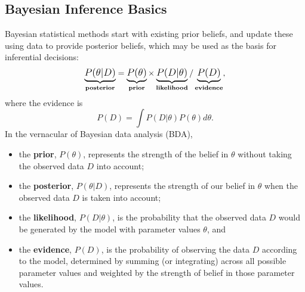 \subsection{Bayesian Inference Basics} 
Bayesian statistical methods start with existing {prior} beliefs, and update these using data to provide {posterior} beliefs, which may be used as the basis for inferential decisions:
$$ \large \underbrace{P( \theta | D )}_{\textbf{posterior}} = \underbrace{P(\theta)}_{\textbf{prior}} \times  \underbrace{P(D|\theta)}_{\textbf{likelihood}} /\underbrace{P(D)}_{\textbf{evidence}}, $$
where the evidence is 
$$ P(D) = \int P(D|\theta) P(\theta) d\theta.$$
In the vernacular of Bayesian data analysis (BDA), 
\begin{itemize}[noitemsep]
\item the \textbf{prior}, $P(\theta)$, represents the strength of the belief in $\theta$ without taking the observed data $D$ into account;
\item the \textbf{posterior}, $P( \theta | D )$, represents the strength of our belief in $\theta$ when the observed data $D$ is taken into account; \item the \textbf{likelihood}, $P(D|\theta)$, is the probability that the observed data $D$ would be generated by the model with parameter values $\theta$, and 
\item the \textbf{evidence}, $P(D)$, is the probability of observing the data $D$ according to the model, determined by summing (or integrating) across all possible parameter values and weighted by the strength of belief in those parameter values.
\end{itemize}
